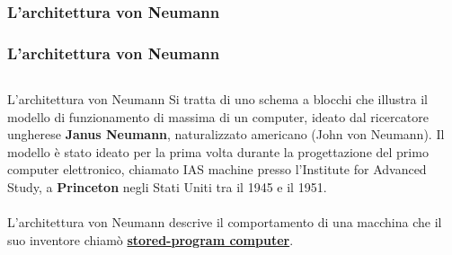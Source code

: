 \subsubsection[L'architettura von Neumann]{L'architettura von Neumann}
\begin{frame}
	\frametitle{L'architettura von Neumann}
	
	
	\begin{columns}			
		\begin{block}{L'architettura von Neumann}
			Si tratta di uno schema a blocchi che illustra il modello di funzionamento di massima di un computer, ideato dal ricercatore ungherese \textbf{Janus Neumann}, naturalizzato americano (John von Neumann). Il modello è stato ideato per la prima volta durante la progettazione del primo computer elettronico, chiamato IAS machine presso l’Institute for Advanced Study, a \textbf{Princeton} negli Stati Uniti tra il 1945 e il 1951.\\~\\
			
			L'architettura von Neumann descrive il comportamento di una macchina che il suo inventore chiamò \underline{\textbf{stored-program computer}}.
		\end{block}
		

\end{columns}
\end{frame}
